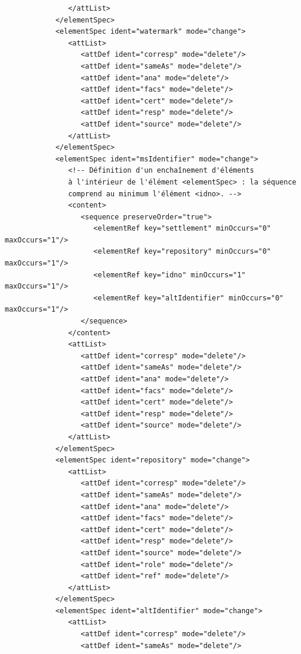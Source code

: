 \documentclass[a4paper,12pt,twoside]{book}
\begin{document}
\begin{verbatim}
               </attList>
            </elementSpec>
            <elementSpec ident="watermark" mode="change">
               <attList>
                  <attDef ident="corresp" mode="delete"/>
                  <attDef ident="sameAs" mode="delete"/>
                  <attDef ident="ana" mode="delete"/>
                  <attDef ident="facs" mode="delete"/>
                  <attDef ident="cert" mode="delete"/>
                  <attDef ident="resp" mode="delete"/>
                  <attDef ident="source" mode="delete"/>
               </attList>
            </elementSpec>
            <elementSpec ident="msIdentifier" mode="change">
               <!-- Définition d'un enchaînement d'éléments 
               à l'intérieur de l'élément <elementSpec> : la séquence 
               comprend au minimum l'élément <idno>. -->
               <content>
                  <sequence preserveOrder="true">
                     <elementRef key="settlement" minOccurs="0" maxOccurs="1"/>
                     <elementRef key="repository" minOccurs="0" maxOccurs="1"/>
                     <elementRef key="idno" minOccurs="1" maxOccurs="1"/>
                     <elementRef key="altIdentifier" minOccurs="0" maxOccurs="1"/>              
                  </sequence>
               </content>
               <attList>
                  <attDef ident="corresp" mode="delete"/>
                  <attDef ident="sameAs" mode="delete"/>
                  <attDef ident="ana" mode="delete"/>
                  <attDef ident="facs" mode="delete"/>
                  <attDef ident="cert" mode="delete"/>
                  <attDef ident="resp" mode="delete"/>
                  <attDef ident="source" mode="delete"/>
               </attList>
            </elementSpec>
            <elementSpec ident="repository" mode="change">
               <attList>
                  <attDef ident="corresp" mode="delete"/>
                  <attDef ident="sameAs" mode="delete"/>
                  <attDef ident="ana" mode="delete"/>
                  <attDef ident="facs" mode="delete"/>
                  <attDef ident="cert" mode="delete"/>
                  <attDef ident="resp" mode="delete"/>
                  <attDef ident="source" mode="delete"/>
                  <attDef ident="role" mode="delete"/>
                  <attDef ident="ref" mode="delete"/>
               </attList>
            </elementSpec>
            <elementSpec ident="altIdentifier" mode="change">
               <attList>
                  <attDef ident="corresp" mode="delete"/>
                  <attDef ident="sameAs" mode="delete"/>

\end{verbatim}
\end{document}

